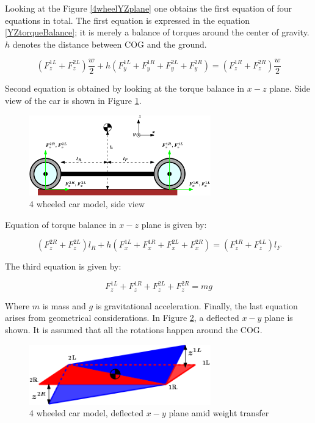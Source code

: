 \documentclass[paper=a4, fontsize=11pt]{scrartcl} %
\numberwithin{equation}{section} %
\numberwithin{figure}{section} %
\numberwithin{table}{section} %
\begin{document}
Looking at the Figure \ref{4wheelYZplane} one obtains the first equation of four equations in total. The first equation is expressed in the equation \ref{YZtorqueBalance}; it is merely a balance of torques around the center of gravity. $h$ denotes the distance between COG and the ground.

\begin{equation}
\left(F^{1L}_z+F^{2L}_z \right)\frac{w}{2} + h\left(F^{1L}_y + F^{1R}_y + F^{2L}_y + F^{2R}_y \right) = \left(F^{1R}_z+F^{2R}_z \right)\frac{w}{2} \label{XZtorqueBalance}
\end{equation} 

Second equation is obtained by looking at the torque balance in $x-z$ plane. Side view of the car is shown in Figure \ref{4wheelXZplane}.

\begin{figure}[h!]
	\centering
	\includegraphics[width=0.7\textwidth]{drawings/4wheelXZplane.png}
	\caption{4 wheeled car model, side view}
	\label{4wheelXZplane}
\end{figure}

Equation of torque balance in $x-z$ plane is given by:

\begin{equation}
\left(F^{2R}_z+F^{2L}_z \right)l_R + h\left(F^{1L}_x + F^{1R}_x + F^{2L}_x + F^{2R}_x\right) = \left(F^{1R}_z+F^{1L}_z \right)l_F \label{YZtorqueBalance}
\end{equation}

The third equation is given by:

\begin{equation}
F^{1L}_z+F^{1R}_z + F^{2L}_z + F^{2R}_z = mg\label{gravityBalance}
\end{equation} 

Where $m$ is mass and $g$ is gravitational acceleration. Finally, the last equation arises from geometrical considerations. In Figure \ref{deflectedPlane}, a deflected $x-y$ plane is shown. It is assumed that all the rotations happen around the COG.

\begin{figure}[h!]
	\centering
	\includegraphics[width=0.7\textwidth]{drawings/deflectedPlane.png}
	\caption{4 wheeled car model, deflected $x-y$ plane amid weight transfer}
	\label{deflectedPlane}
\end{figure}
\end{document}
